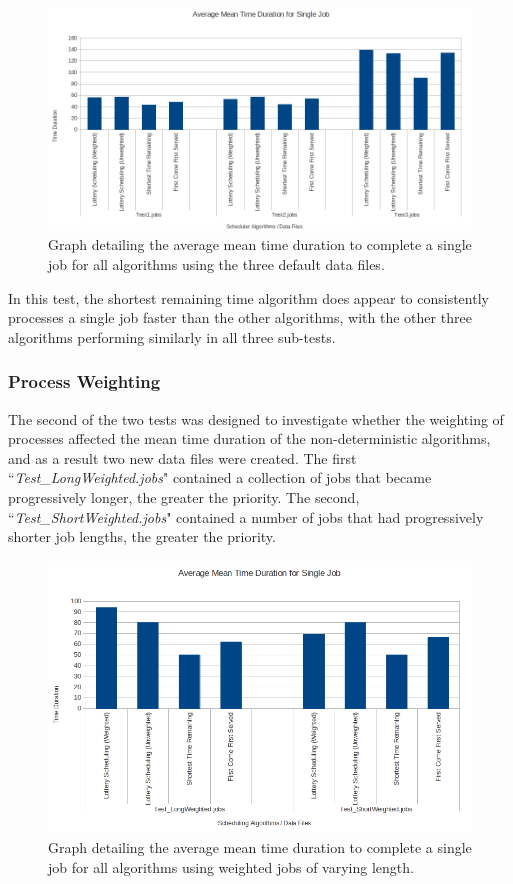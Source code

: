 \documentclass{acm_proc_article-sp}
\begin{document}
\begin{figure}[!htbp]
\centering
\includegraphics[scale=0.25]{graph_meantime1.png}
\caption{Graph detailing the average mean time duration to complete a single job for all algorithms using the three default data files.}
\end{figure}

In this test, the shortest remaining time algorithm does appear to consistently processes a single job faster than the other algorithms, with the other three algorithms performing similarly in all three sub-tests.

\subsubsection{Process Weighting}
The second of the two tests was designed to investigate whether the weighting of processes affected the mean time duration of the non-deterministic algorithms, and as a result two new data files were created. The first ``\textit{Test\_LongWeighted.jobs}" contained a collection of jobs that became progressively longer, the greater the priority. The second, ``\textit{Test\_ShortWeighted.jobs}" contained a number of jobs that had progressively shorter job lengths, the greater the priority.

\begin{figure}[!htbp]
\centering
\includegraphics[scale=0.3]{graph_meantime2.png}
\caption{Graph detailing the average mean time duration to complete a single job for all algorithms using weighted jobs of varying length.}
\end{figure}
\end{document}
